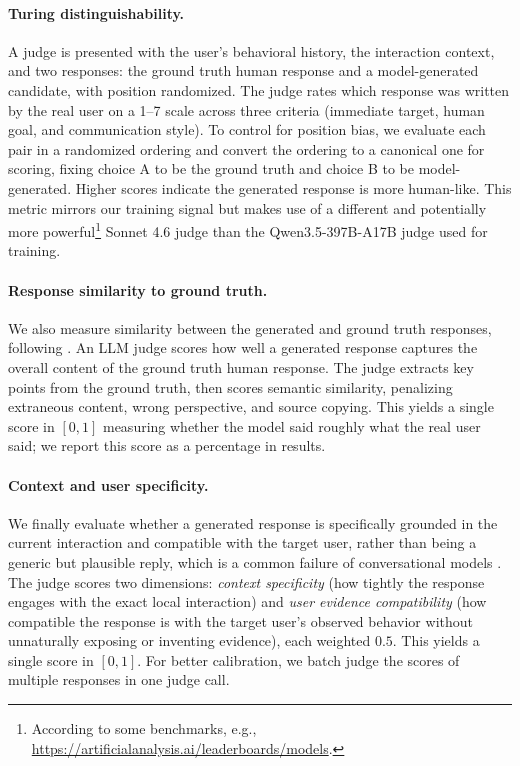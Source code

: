\documentclass[11pt]{article}
\begin{document}
\paragraph{Turing distinguishability.}
 A judge is presented with the user's behavioral history, the interaction context, and two responses: the ground truth human response and a model-generated candidate, with position randomized. The judge rates which response was written by the real user on a 1--7 scale across three criteria (immediate target, human goal, and communication style). To control for position bias, we evaluate each pair in a randomized ordering and convert the ordering to a canonical one for scoring, fixing choice A to be the ground truth and choice B to be model-generated. Higher scores indicate the generated response is more human-like. This metric mirrors our training signal but makes use of a different and potentially more powerful\footnote{According to some benchmarks, e.g., \url{https://artificialanalysis.ai/leaderboards/models}.}   Sonnet 4.6 judge than the Qwen3.5-397B-A17B judge  used for training.

\paragraph{Response similarity to ground truth.} We also measure similarity between the generated and ground truth responses, following \citet{wu2026humanlm}.  An LLM judge scores how well a generated response captures the overall content of the ground truth human response. The judge extracts key points from the ground truth, then scores semantic similarity, penalizing extraneous content, wrong perspective, and source copying. This yields a single score in $[0, 1]$ measuring whether the model said roughly what the real user said; we report this score as a percentage in results.

\paragraph{Context and user specificity.}
We finally evaluate whether a generated response is specifically grounded in the current interaction and compatible with the target user, rather than being a generic but plausible reply, which is a common failure of conversational models \citep{li2016diversity, user_sim_survey}. The judge scores two dimensions: \emph{context specificity} (how tightly the response engages with the exact local interaction) and \emph{user evidence compatibility} (how compatible the response is with the target user's observed behavior without unnaturally exposing or inventing evidence), each weighted $0.5$. This yields a single score in $[0, 1]$. For better calibration, we batch judge the scores of multiple responses in one judge call.
\end{document}
